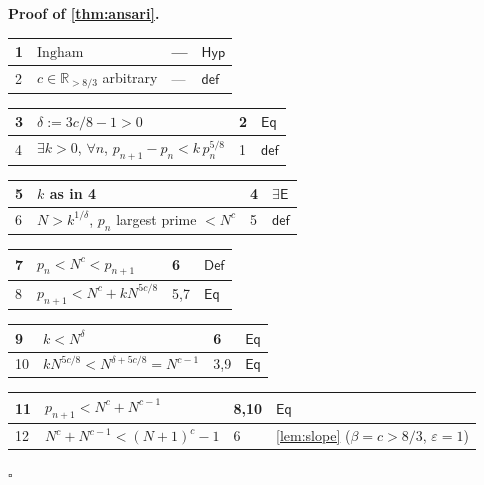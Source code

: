 \documentclass[11pt,reqno]{amsart}
\theoremstyle{blueplain}
\renewcommand{\qedsymbol}{\textcolor{proofqed}{\ensuremath{\square}}}
\renewenvironment{proof}[1][Proof]{\par\noindent\textbf{\textcolor{proofhead}{#1.}}\par\nobreak}{\par\nobreak\hfill\qedsymbol}
\numberwithin{equation}{section}
\begin{document}
\begin{proof}[\textbf{Proof of \cref{thm:ansari}}]
\label{proof:ansari}
{\scriptsize
\begin{tabular}{|m{0.7cm}|m{12cm}|m{1.4cm}|m{2.5cm}|}
\hline
1 & $\text{Ingham}$ & --- & $\mathsf{Hyp}$ \\ \hline
2 & $c\in\mathbb{R}_{>8/3}$ arbitrary & --- & $\mathsf{def}$ \\
\end{tabular}%
\noindent \newline
\noindent
\begin{tabular}{|m{0.7cm}|m{12cm}|m{1.4cm}|m{2.5cm}|}
\hline
3 & $\delta:=3c/8-1>0$ & 2 & $\mathsf{Eq}$ \\ \hline
4 & $\exists k>0$, $\forall n$, $p_{n+1}-p_n<k\,p_n^{5/8}$ & 1 & $\mathsf{def}$ \\
\end{tabular}%
\noindent \newline
\noindent
\begin{tabular}{|m{0.7cm}|m{12cm}|m{1.4cm}|m{2.5cm}|}
\hline
5 & $k$ as in 4 & 4 & $\exists\mathsf{E}$ \\ \hline
6 & $N>k^{1/\delta}$, $p_n$ largest prime $<N^{c}$ & 5 & $\mathsf{def}$ \\
\end{tabular}%
\noindent \newline
\noindent
\begin{tabular}{|m{0.7cm}|m{12cm}|m{1.4cm}|m{2.5cm}|}
\hline
7 & $p_n<N^{c}<p_{n+1}$ & 6 & $\mathsf{Def}$ \\ \hline
8 & $p_{n+1}<N^{c}+k N^{5c/8}$ & 5,7 & $\mathsf{Eq}$ \\
\end{tabular}%
\noindent \newline
\noindent
\begin{tabular}{|m{0.7cm}|m{12cm}|m{1.4cm}|m{2.5cm}|}
\hline
9 & $k<N^{\delta}$ & 6 & $\mathsf{Eq}$ \\ \hline
10 & $k N^{5c/8}<N^{\delta+5c/8}=N^{c-1}$ & 3,9 & $\mathsf{Eq}$ \\
\end{tabular}%
\noindent \newline
\noindent
\begin{tabular}{|m{0.7cm}|m{12cm}|m{1.4cm}|m{2.5cm}|}
\hline
11 & $p_{n+1}<N^{c}+N^{c-1}$ & 8,10 & $\mathsf{Eq}$ \\ \hline
12 & $N^{c}+N^{c-1}<(N+1)^{c}-1$ & 6 & \cref{lem:slope} ($\beta=c>8/3$, $\varepsilon=1$) \\

\end{tabular}}
\end{proof}
\end{document}
